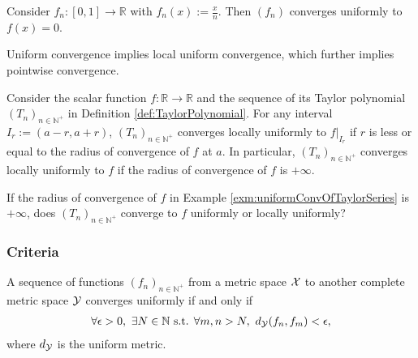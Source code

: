 \begin{exm}
  Consider $f_n:[0,1]\rightarrow \mathbb{R}$
   with $f_n(x):=\frac{x}{n}$.
  Then $(f_n)$ converges uniformly to $f(x)=0$.
\end{exm}

\begin{thm}
  \label{thm:funcConvergenceRelations}
  Uniform convergence implies local uniform convergence,
  which further implies pointwise convergence.
\end{thm}

\begin{exm}
  \label{exm:uniformConvOfTaylorSeries}
  Consider the scalar function $f:\mathbb{R}\rightarrow\mathbb{R}$
   and the sequence of its Taylor polynomial
   $(T_n)_{n\in\mathbb{N}^+}$ in Definition \ref{def:TaylorPolynomial}.
  For any interval \mbox{$I_r:=(a-r,a+r)$},
  $(T_n)_{n\in\mathbb{N}^+}$ converges locally uniformly
  to $f|_{I_r}$ if $r$ is less or equal to the radius of convergence
  of $f$ at $a$.
  In particular,
  $(T_n)_{n\in\mathbb{N}^+}$ converges locally uniformly to $f$
  if the radius of convergence of $f$ is $+\infty$.
\end{exm}

\begin{exc}
  If the radius of convergence of $f$ in
  Example \ref{exm:uniformConvOfTaylorSeries} 
  is $+\infty$,
  does $(T_n)_{n\in\mathbb{N}^+}$ converge to $f$
  uniformly or locally uniformly?
\end{exc}

\subsubsection{Criteria}

\begin{thm}
  \label{thm:CauchyCriterionUniformConv}
  A sequence of functions $(f_n)_{n\in\mathbb{N}^+}$ 
  from a metric space ${\cal X}$
  to another complete metric space ${\cal Y}$
  converges uniformly if and only if
  \begin{equation}
    \label{eq:CauchyCriterionUniformConv}
    \begin{array}{l}
    \forall \epsilon>0,\ \exists N\in\mathbb{N} \text{ s.t. }
    \forall m,n > N,\
    d_{\cal Y}(f_n, f_m) < \epsilon, 
    \end{array}
  \end{equation}
  where $d_{\cal Y}$ is the uniform metric. 
\end{thm}

